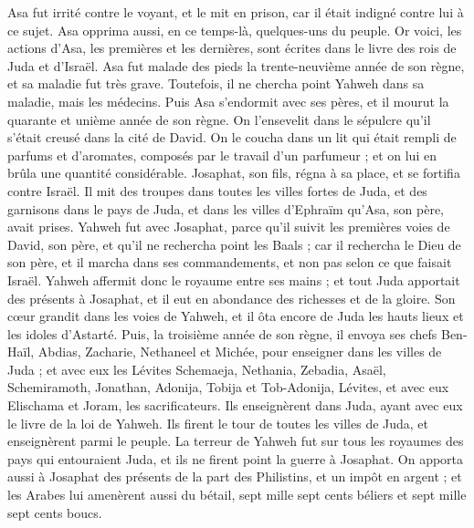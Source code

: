 \begin{multicols}{2}
Asa fut irrité contre le voyant, et le mit en prison, car il était indigné contre lui à ce sujet. Asa opprima aussi, en ce temps-là, quelques-uns du peuple.
Or voici, les actions d'Asa, les premières et les dernières, sont écrites dans le livre des rois de Juda et d'Israël.
Asa fut malade des pieds la trente-neuvième année de son règne, et sa maladie fut très grave. Toutefois, il ne chercha point Yahweh dans sa maladie, mais les médecins.
Puis Asa s'endormit avec ses pères, et il mourut la quarante et unième année de son règne.
On l'ensevelit dans le sépulcre qu'il s'était creusé dans la cité de David. On le coucha dans un lit qui était rempli de parfums et d'aromates, composés par le travail d’un parfumeur ; et on lui en brûla une quantité considérable.
\VerseOne{}Josaphat, son fils, régna à sa place, et se fortifia contre Israël.
Il mit des troupes dans toutes les villes fortes de Juda, et des garnisons dans le pays de Juda, et dans les villes d'Ephraïm qu'Asa, son père, avait prises.
Yahweh fut avec Josaphat, parce qu'il suivit les premières voies de David, son père, et qu'il ne rechercha point les Baals ;
car il rechercha le Dieu de son père, et il marcha dans ses commandements, et non  pas selon ce que faisait Israël.
Yahweh affermit donc le royaume entre ses mains ; et tout Juda apportait des présents à Josaphat, et il eut en abondance des richesses et de la gloire.
Son cœur grandit dans les voies de Yahweh, et il ôta encore de Juda les hauts lieux et les idoles d'Astarté.
Puis, la troisième année de son règne, il envoya ses chefs Ben-Haïl, Abdias, Zacharie, Nethaneel et Michée, pour enseigner dans les villes de Juda ;
et avec eux les Lévites Schemaeja, Nethania, Zebadia, Asaël, Schemiramoth, Jonathan, Adonija, Tobija et Tob-Adonija, Lévites, et avec eux Elischama et Joram, les sacrificateurs.
Ils enseignèrent dans Juda, ayant avec eux le livre de la loi de Yahweh. Ils firent le tour de toutes les villes de Juda, et enseignèrent parmi le peuple.
La terreur de Yahweh fut sur tous les royaumes des pays qui entouraient Juda, et ils ne firent point la guerre à Josaphat.
On apporta aussi à Josaphat des présents de la part des Philistins, et un impôt en argent ; et les Arabes lui amenèrent aussi du bétail, sept mille sept cents béliers et sept mille sept cents boucs.

\end{multicols}
